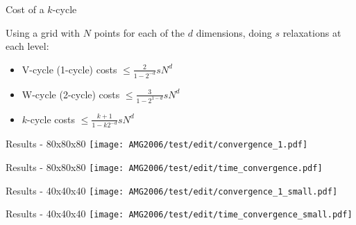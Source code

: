 \documentclass{beamer}
\begin{document}
\begin{frame}{Cost of a $k$-cycle}
 
 Using a grid with $N$ points for each of the $d$ dimensions, doing $s$ relaxations at each level:
 \begin{itemize}
  \item V-cycle (1-cycle) costs $\leq \frac{2}{1-2^{-d}} sN^d$
  \item W-cycle (2-cycle) costs $\leq \frac{3}{1-2^{1-d}} sN^d$
  \item $k$-cycle costs $\leq \frac{k+1}{1-k2^{-d}} sN^d$
  \end{itemize}
\end{frame}

\begin{frame}{Results - 80x80x80}
 \texttt{[image: AMG2006/test/edit/convergence\_1.pdf]}
\end{frame}
\begin{frame}{Results - 80x80x80}
 \texttt{[image: AMG2006/test/edit/time\_convergence.pdf]}
\end{frame}
\begin{frame}{Results - 40x40x40}
 \texttt{[image: AMG2006/test/edit/convergence\_1\_small.pdf]}
\end{frame}
\begin{frame}{Results - 40x40x40}
 \texttt{[image: AMG2006/test/edit/time\_convergence\_small.pdf]}
\end{frame}
\end{document}
